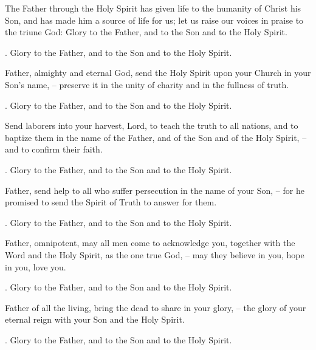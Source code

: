 \lettrine[lines=2]{T}{}he Father through the Holy Spirit has given life to the humanity of Christ his Son, and has made him a source of life for us; let us raise our voices in praise to the triune God: Glory to the Father, and to the Son and to the Holy Spirit.
\par \Rbar. Glory to the Father, and to the Son and to the Holy Spirit.

Father, almighty and eternal God, send the Holy Spirit upon your Church in your Son’s name,
– preserve it in the unity of charity and in the fullness of truth.
\par \Rbar. Glory to the Father, and to the Son and to the Holy Spirit.

Send laborers into your harvest, Lord, to teach the truth to all nations, and to baptize them in the name of the Father, and of the Son and of the Holy Spirit,
– and to confirm their faith.
\par \Rbar. Glory to the Father, and to the Son and to the Holy Spirit.

Father, send help to all who suffer persecution in the name of your Son,
– for he promised to send the Spirit of Truth to answer for them.
\par \Rbar. Glory to the Father, and to the Son and to the Holy Spirit.

Father, omnipotent, may all men come to acknowledge you, together with the Word and the Holy Spirit, as the one true God,
– may they believe in you, hope in you, love you.
\par \Rbar. Glory to the Father, and to the Son and to the Holy Spirit.

Father of all the living, bring the dead to share in your glory,
– the glory of your eternal reign with your Son and the Holy Spirit.
\par \Rbar. Glory to the Father, and to the Son and to the Holy Spirit.
